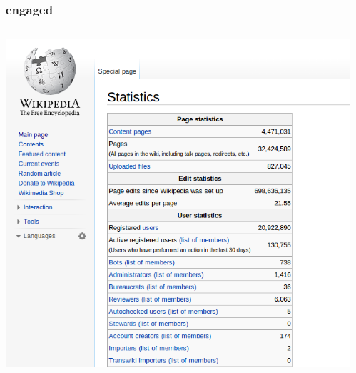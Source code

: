 \documentclass{beamer}
\begin{document}
\begin{frame}
  \frametitle{engaged}
  \begin{columns}
    \begin{column}{0.5\textwidth}
      \includegraphics[height = 0.8\textheight, width = \textwidth, keepaspectratio = true]{figure/wiki_stats}
    \end{column}
    \begin{column}{0.5\textwidth}

\end{column}
\end{columns}
\end{frame}
\end{document}
